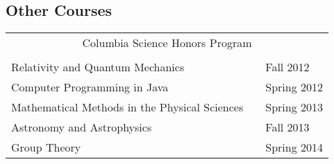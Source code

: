 \documentclass[margin]{res}
\begin{document}
\begin{resume}
\section{Other Courses}
  \begin{tabular}{l p{1in} l}
    \\
    \multicolumn{3}{c}{Columbia Science Honors Program} \\
    \\
    Relativity and Quantum Mechanics & \hfill & Fall 2012 \\
    Computer Programming in Java & \hfill & Spring 2012 \\
    Mathematical Methods in the Physical Sciences & \hfill & Spring 2013 \\
    Astronomy and Astrophysics & \hfill & Fall 2013 \\
    Group Theory & \hfill & Spring 2014 \\
  \end{tabular}

\end{resume}
\end{document}
